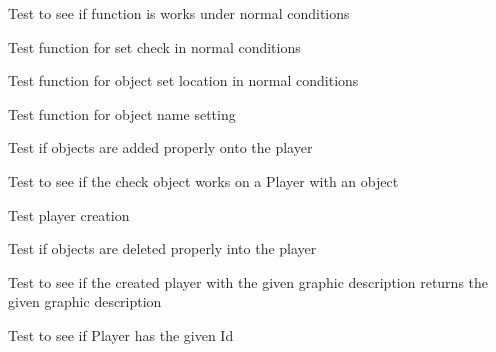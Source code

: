 \begin{DoxyRefList}
\item[\label{test__test000170}%
\hypertarget{test__test000170}{}%
Member \hyperlink{object__test_8h_a6a429a7c9cd7e16fb861f2d21d471f80}{test1\+\_\+object\+\_\+is} ()]Test to see if function is works under normal conditions  
\item[\label{test__test000154}%
\hypertarget{test__test000154}{}%
Member \hyperlink{object__test_8h_a7e652e4dcf897db42363f6098bc1c3da}{test1\+\_\+object\+\_\+set\+\_\+check} ()]Test function for set check in normal conditions  
\item[\label{test__test000151}%
\hypertarget{test__test000151}{}%
Member \hyperlink{object__test_8h_aeed901e95aa669185059c85183e68a24}{test1\+\_\+object\+\_\+set\+\_\+location} ()]Test function for object set location in normal conditions  
\item[\label{test__test000148}%
\hypertarget{test__test000148}{}%
Member \hyperlink{object__test_8h_a74e25ad653c4a32b9922fff8e4f916fd}{test1\+\_\+object\+\_\+set\+\_\+name} ()]Test function for object name setting  
\item[\label{test__test000197}%
\hypertarget{test__test000197}{}%
Member \hyperlink{player__test_8h_a14a3e4867e2ad3287c8efa99cd36904e}{test1\+\_\+player\+\_\+add\+\_\+object} ()]Test if objects are added properly onto the player  
\item[\label{test__test000209}%
\hypertarget{test__test000209}{}%
Member \hyperlink{player__test_8h_a95396b550249d790fe55be1e553517ae}{test1\+\_\+player\+\_\+check\+\_\+object} ()]Test to see if the check object works on a Player with an object  
\item[\label{test__test000172}%
\hypertarget{test__test000172}{}%
Member \hyperlink{player__test_8h_ab29768452373e16bb6aaa1f7998f62fb}{test1\+\_\+player\+\_\+create} ()]Test player creation  
\item[\label{test__test000199}%
\hypertarget{test__test000199}{}%
Member \hyperlink{player__test_8h_ab8680555a9d30950ffa0547011a0f787}{test1\+\_\+player\+\_\+del\+\_\+object} ()]Test if objects are deleted properly into the player  
\item[\label{test__test000187}%
\hypertarget{test__test000187}{}%
Member \hyperlink{player__test_8h_a07beea3b974453e5d8001d04e6db5ac4}{test1\+\_\+player\+\_\+get\+\_\+graphic\+\_\+description} ()]Test to see if the created player with the given graphic description returns the given graphic description  
\item[\label{test__test000185}%
\hypertarget{test__test000185}{}%
Member \hyperlink{player__test_8h_a790a75dc179c00c60c784d3e34c0e5aa}{test1\+\_\+player\+\_\+get\+\_\+id} ()]Test to see if Player has the given Id  

\end{DoxyRefList}
